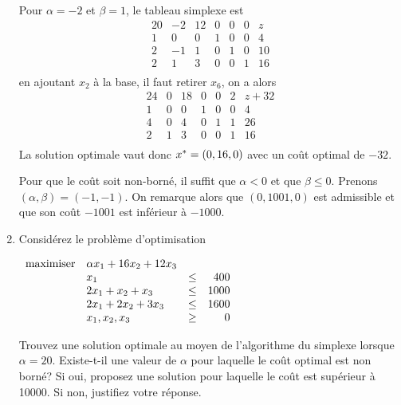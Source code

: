 \begin{enumerate}
    \begin{solution}
      Pour $\alpha = -2$ et $\beta = 1$, le tableau simplexe est
      \[
        \begin{array}{cccccc|l}
          20 & -2 & 12 & 0 & 0 & 0 & z\\
          \hline
          1  &  0 &  0 & 1 & 0 & 0 & 4\\
          2  & -1 &  1 & 0 & 1 & 0 & 10\\
          2  &  1 &  3 & 0 & 0 & 1 & 16\\
        \end{array}
      \]
      en ajoutant $x_2$ à la base,
      il faut retirer $x_6$, on a alors
      \[
        \begin{array}{cccccc|l}
          24 & 0 & 18 & 0 & 0 & 2 & z+32\\
          \hline
          1  & 0 &  0 & 1 & 0 & 0 & 4\\
          4  & 0 &  4 & 0 & 1 & 1 & 26\\
          2  & 1 &  3 & 0 & 0 & 1 & 16\\
        \end{array}
      \]
      La solution optimale vaut donc $x^* = (0,16,0)$ avec
      un coût optimal de $-32$.

      Pour que le coût soit non-borné, il suffit que $\alpha < 0$ et que
      $\beta \leq 0$.
      Prenons $(\alpha,\beta) = (-1,-1)$.
      On remarque alors que $(0,1001,0)$ est admissible et que son
      coût $-1001$ est inférieur à $-1000$.
    \end{solution}

  \item  Considérez le problème d'optimisation

    $
    \begin{array}{llcr}
      \mbox{maximiser}
      & \alpha x_1 + 16x_2+ 12x_3\\
      &        x_1                & \leq & 400\\
      &       2x_1 +   x_2+   x_3 & \leq & 1000\\
      &       2x_1 +  2x_2+  3x_3 & \leq & 1600\\
      &        x_1, x_2, x_3 & \geq & 0
    \end{array}
    $

    Trouvez une solution optimale au moyen de l'algorithme du simplexe
    lorsque $\alpha=20$.
    Existe-t-il une valeur de $\alpha$ pour laquelle le coût optimal
    est non borné?
    Si oui,
    proposez une solution pour laquelle le coût est supérieur à 10000.
    Si non, justifiez votre réponse.


\end{enumerate}
